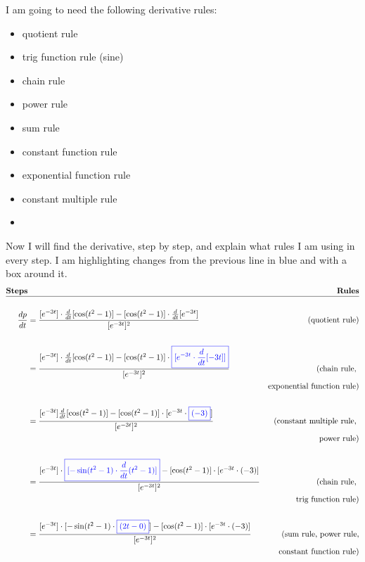 \documentclass[letter, 12pt]{article}
\newcommand{\blue}[1]{\textcolor{blue}{\boxed{#1}}}
\newcommand{\diff}[1]{\frac{d}{d#1}}
\begin{document}
I am going to need the following derivative rules:
\begin{multicols}{3}
	\begin{itemize}
		\item quotient rule
		\item trig function rule (sine)
		\item chain rule
		\item power rule
		\item sum rule
		\item constant function rule
		\item exponential function rule
		\item constant multiple rule
		\item[]
	\end{itemize}
\end{multicols}
Now I will find the derivative, step by step, and 
explain what rules I am using in every step.
I am highlighting changes from the previous line in blue and with a box around it.
\begin{align*}
\textbf{Steps}& 
& \textbf{Rules} \\\hline
&&\\
\frac{dp}{dt} &= \frac{[e^{-3t}]\cdot \diff{t}[\cos(t^2-1)] - 
					   [\cos(t^2-1)]\cdot \diff{t}[e^{-3t}]}
					  {[e^{-3t}]^2}
& \textrm{(quotient rule)} \\ \\
&= \frac{[e^{-3t}] \cdot \diff{t}[\cos(t^2-1)] - 
         [\cos(t^2-1)]\cdot
         \blue{[e^{-3t}\cdot\diff{t}[-3t]]}}
		{[e^{-3t}]^2} 
& \textrm{(chain rule, } \\ 
&& \textrm{exponential function rule)} \\ \\
&= \frac{[e^{-3t}] \diff{t}[\cos(t^2-1)] - 
         [\cos(t^2-1)]\cdot 
		 [e^{-3t}\cdot\blue{(-3)}]}
		{[e^{-3t}]^2} 
& \textrm{(constant multiple rule, } \\
&& \textrm{power rule)} \\ \\
&= \frac{[e^{-3t}] \cdot
         \blue{[-\sin(t^2-1)\cdot\diff{t}(t^2-1)]} - 
		 [\cos(t^2-1)]\cdot 
         [e^{-3t}\cdot(-3)]}
		{[e^{-3t}]^2}
& \textrm{(chain rule, } \\
&& \textrm{trig function rule)} \\ \\
&= \frac{[e^{-3t}] \cdot
         [-\sin(t^2-1)\cdot \blue{(2t-0)}] - 
		 [\cos(t^2-1)]\cdot 
         [e^{-3t}\cdot(-3)]}
		{[e^{-3t}]^2}
& \textrm{(sum rule, power rule,} \\
&& \textrm{constant function rule)}
\end{align*}
\end{document}
